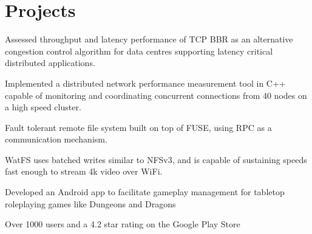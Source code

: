 \documentclass[]{chowes-resume}
\begin{document}
\begin{minipage}[t]{0.66\textwidth}
\section{Projects}

\begin{tightemize}
\item Assessed throughput and latency performance of TCP BBR as an alternative congestion control algorithm for data centres supporting latency critical distributed applications.
\item Implemented a distributed network performance measurement tool in C++ capable of monitoring and coordinating concurrent connections from 40 nodes on a high speed cluster.
\end{tightemize}
\sectionsep

\begin{tightemize}
\item Fault tolerant remote file system built on top of FUSE, using RPC as a communication mechanism. 
\item WatFS uses batched writes similar to NFSv3, and is capable of sustaining speeds fast enough to stream 4k video over WiFi.
\end{tightemize}
\sectionsep

\begin{tightemize}
\item Developed an Android app to facilitate gameplay management for tabletop roleplaying games like Dungeons and Dragons
\item Over 1000 users and a 4.2 star rating on the Google Play Store
\end{tightemize}
\sectionsep

\end{minipage} 
\end{document}
